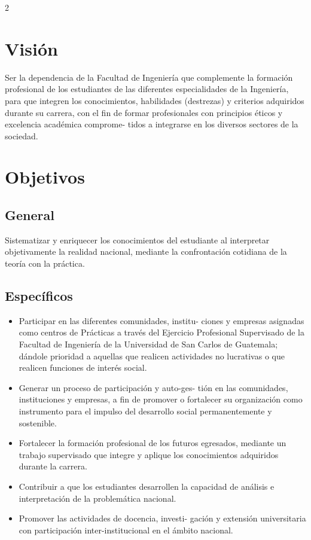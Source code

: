 \documentclass[12pt,spanish,Letterpaper,openany]{book}
\begin{document}
\begin {multicols}{2}
\hypertarget{vision}{%
\section*{Visión}\label{vision}}

Ser la dependencia de la Facultad de Ingeniería que complemente la formación profesional de los estudiantes de las diferentes especialidades de la Ingeniería, para que integren los conocimientos, habilidades (destrezas) y criterios adquiridos durante su carrera, con el fin de formar profesionales con principios éticos y excelencia académica comprome-
tidos a integrarse en los diversos sectores de la sociedad.

\hypertarget{objetivos}{%
\section*{Objetivos}\label{objetivos}}

\hypertarget{general}{%
\subsection*{General}\label{general}}

Sistematizar y enriquecer los conocimientos del estudiante al interpretar objetivamente la realidad nacional, mediante la confrontación cotidiana de la teoría con la práctica.

\hypertarget{especificos}{%
\subsection*{Específicos}\label{especificos}}

\begin{itemize}
\item
  Participar en las diferentes comunidades, institu-
  ciones y empresas asignadas como centros de Prácticas a través del Ejercicio Profesional Supervisado de la Facultad de Ingeniería de la Universidad de San Carlos de Guatemala; dándole prioridad a aquellas que realicen actividades no lucrativas o que realicen funciones de interés social.
\item
  Generar un proceso de participación y auto-ges-
  tión en las comunidades, instituciones y empresas, a fin de promover o fortalecer su organización como instrumento para el impulso del desarrollo social permanentemente y sostenible.
\item
  Fortalecer la formación profesional de los futuros egresados, mediante un trabajo supervisado que integre y aplique los conocimientos adquiridos durante la carrera.
\item
  Contribuir a que los estudiantes desarrollen la capacidad de análisis e interpretación de la problemática nacional.
\item
  Promover las actividades de docencia, investi-
  gación y extensión universitaria con participación inter-institucional en el ámbito nacional.
\end{itemize}


\end{multicols}
\end{document}
